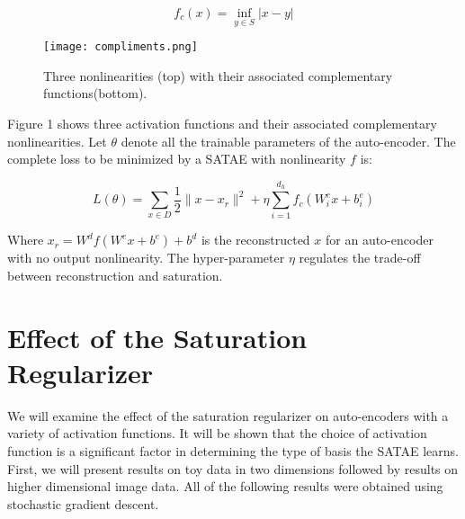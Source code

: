 \documentclass{article} %
\begin{document}
\begin{equation}
f_c(x) = \inf_ {y \in S} |x-y|   
\end{equation}   

\begin{figure}
\centering 
\texttt{[image: compliments.png]}
\caption{Three nonlinearities (top) with their associated complementary functions(bottom).}  
\end{figure} 

\noindent
Figure 1 shows three activation functions and their associated complementary nonlinearities. Let $\theta$ denote all the trainable parameters of the auto-encoder. The complete loss to be minimized by a SATAE with nonlinearity $f$ is: 

\begin{equation} 
L(\theta) = \sum_{x \in D} \frac{1}{2} \|x-x_r\|^2 + \eta \sum_{i=1}^{d_h}f_c(W^e_i x + b^e_i)
\end{equation}    

\noindent
Where $x_r = W^df(W^e x + b^e) + b^d$ is the reconstructed $x$ for an auto-encoder with no output nonlinearity. The hyper-parameter $\eta$ regulates the trade-off between reconstruction and saturation.  

\section{Effect of the Saturation Regularizer} 
We will examine the effect of the saturation regularizer on auto-encoders with a variety of activation functions. It will be shown that the choice of activation function is a significant factor in determining the type of basis the SATAE learns. First, we will present results on toy data in two dimensions followed by results on higher dimensional image data. All of the following results were obtained using stochastic gradient descent.  
\end{document}
